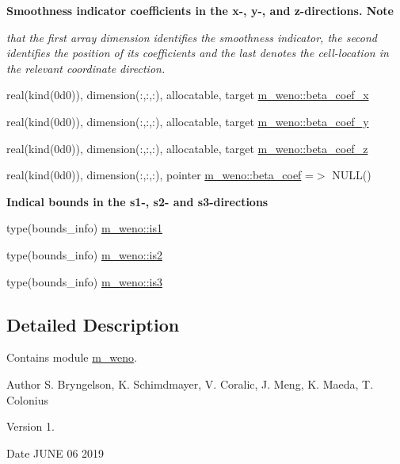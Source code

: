 \begin{Indent}\textbf{ Smoothness indicator coefficients in the x-\/, y-\/, and z-\/directions. Note}\par
{\em that the first array dimension identifies the smoothness indicator, the second identifies the position of its coefficients and the last denotes the cell-\/location in the relevant coordinate direction. }\begin{DoxyCompactItemize}
\item 
real(kind(0d0)), dimension(\+:,\+:,\+:), allocatable, target \hyperlink{namespacem__weno_a134c95205f767fc0d36631c6426eaad9}{m\+\_\+weno\+::beta\+\_\+coef\+\_\+x}
\item 
real(kind(0d0)), dimension(\+:,\+:,\+:), allocatable, target \hyperlink{namespacem__weno_aa1574c8b4d69b5e40fa2ec0c86816136}{m\+\_\+weno\+::beta\+\_\+coef\+\_\+y}
\item 
real(kind(0d0)), dimension(\+:,\+:,\+:), allocatable, target \hyperlink{namespacem__weno_aea41f263d17898f7dbe955a7ff6edff7}{m\+\_\+weno\+::beta\+\_\+coef\+\_\+z}
\item 
real(kind(0d0)), dimension(\+:,\+:,\+:), pointer \hyperlink{namespacem__weno_a9dc5624a505436521a68a439e02ade3d}{m\+\_\+weno\+::beta\+\_\+coef} =$>$ N\+U\+LL()
\end{DoxyCompactItemize}
\end{Indent}
\begin{Indent}\textbf{ Indical bounds in the s1-\/, s2-\/ and s3-\/directions}\par
\begin{DoxyCompactItemize}
\item 
type(bounds\+\_\+info) \hyperlink{namespacem__weno_ac3ef0890373b2575a3bd9ed112c31865}{m\+\_\+weno\+::is1}
\item 
type(bounds\+\_\+info) \hyperlink{namespacem__weno_aceec79b8e24447024e5ccbc46f42300f}{m\+\_\+weno\+::is2}
\item 
type(bounds\+\_\+info) \hyperlink{namespacem__weno_a705812a0239b1d121413020e61ef25bc}{m\+\_\+weno\+::is3}
\end{DoxyCompactItemize}
\end{Indent}


\subsection{Detailed Description}
Contains module \hyperlink{namespacem__weno}{m\+\_\+weno}. 

\begin{DoxyAuthor}{Author}
S. Bryngelson, K. Schimdmayer, V. Coralic, J. Meng, K. Maeda, T. Colonius 
\end{DoxyAuthor}
\begin{DoxyVersion}{Version}
1. 
\end{DoxyVersion}
\begin{DoxyDate}{Date}
J\+U\+NE 06 2019 
\end{DoxyDate}

